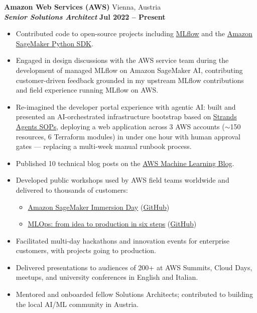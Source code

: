 \documentclass[11pt,a4paper]{article}
\newcommand{\company}[2]{%
  {\large\bfseries #1} \hfill {\color{loccolor}#2}\\[2pt]%
}
\newcommand{\role}[2]{%
  {\bfseries\itshape #1} \hfill {\color{datecolor}\bfseries #2}\vspace{3pt}%
}
\begin{document}
\company{Amazon Web Services (AWS)}{Vienna, Austria}
\role{Senior Solutions Architect}{Jul 2022 -- Present}
\begin{itemize}[nosep,leftmargin=*]
\item Contributed code to open-source projects including \href{https://github.com/mlflow/mlflow/pull/7044}{MLflow} and the \href{https://github.com/aws/sagemaker-python-sdk/pull/5525}{Amazon SageMaker Python SDK}.
\item Engaged in design discussions with the AWS service team during the development of managed MLflow on Amazon SageMaker AI, contributing customer-driven feedback grounded in my upstream MLflow contributions and field experience running MLflow on AWS.
\item Re-imagined the developer portal experience with agentic AI: built and presented an AI-orchestrated infrastructure bootstrap based on \href{https://github.com/strands-agents/agent-sop}{Strands Agents SOPs}, deploying a web application across 3 AWS accounts ($\sim$150 resources, 6 Terraform modules) in under one hour with human approval gates --- replacing a multi-week manual runbook process.
\item Published 10 technical blog posts on the \href{https://aws.amazon.com/blogs/machine-learning/author/frpaolo/}{AWS Machine Learning Blog}.
\item Developed public workshops used by AWS field teams worldwide and delivered to thousands of customers:
  \begin{itemize}[nosep]
    \item \href{https://sagemaker-immersionday.workshop.aws/}{Amazon SageMaker Immersion Day} (\href{https://github.com/aws-samples/amazon-sagemaker-immersion-day}{GitHub})
    \item \href{https://catalog.workshops.aws/mlops-from-idea-to-production}{MLOps: from idea to production in six steps} (\href{https://github.com/aws-samples/amazon-sagemaker-from-idea-to-production}{GitHub})
  \end{itemize}
\item Facilitated multi-day hackathons and innovation events for enterprise customers, with projects going to production.
\item Delivered presentations to audiences of 200+ at AWS Summits, Cloud Days, meetups, and university conferences in English and Italian.
\item Mentored and onboarded fellow Solutions Architects; contributed to building the local AI/ML community in Austria.
\end{itemize}
\end{document}
